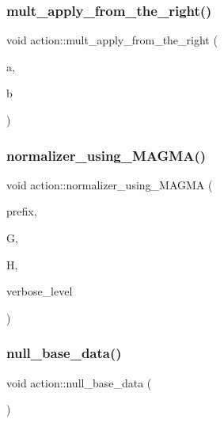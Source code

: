 \subsubsection{\texorpdfstring{mult\+\_\+apply\+\_\+from\+\_\+the\+\_\+right()}{mult\_apply\_from\_the\_right()}}
{\footnotesize\ttfamily void action\+::mult\+\_\+apply\+\_\+from\+\_\+the\+\_\+right (\begin{DoxyParamCaption}\item[{void $\ast$}]{a,  }\item[{void $\ast$}]{b }\end{DoxyParamCaption})}

\mbox{\label{classaction_aabd3d7d876b5379a12a595c272ba030c}} 
\subsubsection{\texorpdfstring{normalizer\+\_\+using\+\_\+\+M\+A\+G\+M\+A()}{normalizer\_using\_MAGMA()}}
{\footnotesize\ttfamily void action\+::normalizer\+\_\+using\+\_\+\+M\+A\+G\+MA (\begin{DoxyParamCaption}\item[{const \mbox{\hyperlink{galois_8h_ab6cc7b4aeb6ea31aba2b3fbfc83ff5e6}{B\+Y\+TE}} $\ast$}]{prefix,  }\item[{\mbox{\hyperlink{classsims}{sims}} $\ast$}]{G,  }\item[{\mbox{\hyperlink{classsims}{sims}} $\ast$}]{H,  }\item[{\mbox{\hyperlink{galois_8h_a09fddde158a3a20bd2dcadb609de11dc}{I\+NT}}}]{verbose\+\_\+level }\end{DoxyParamCaption})}

\mbox{\label{classaction_a09d62a3dd408d1c0704b380b26f72fb0}} 
\subsubsection{\texorpdfstring{null\+\_\+base\+\_\+data()}{null\_base\_data()}}
{\footnotesize\ttfamily void action\+::null\+\_\+base\+\_\+data (\begin{DoxyParamCaption}{ }\end{DoxyParamCaption})}

